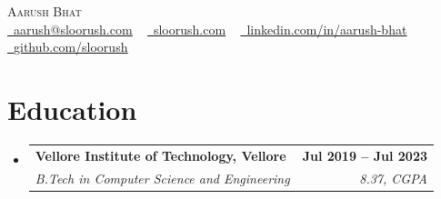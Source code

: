 \documentclass[a4paper,11pt]{article}
\makeatletter
\newcommand{\resumeSubheading}[4]{
  \vspace{-2pt}\item
    \begin{tabular*}{1.0\textwidth}[t]{l@{\extracolsep{\fill}}r}
      \textbf{#1} & \textbf{\small #2} \\
      \textit{\small#3} & \textit{\small #4} \\
    \end{tabular*}\vspace{-7pt}
}
\newcommand{\resumeSubHeadingListStart}{\begin{itemize}[leftmargin=0.0in, label={}]}
\newcommand{\resumeSubHeadingListEnd}{\end{itemize}}
\makeatother
\begin{document}

\begin{center}
    {\Huge \scshape Aarush Bhat} \\ \vspace{8pt}
    \small 
    \href{mailto:aarush@sloorush.com}{\raisebox{-0.2\height}\faEnvelope\  \underline{aarush@sloorush.com}} ~ 
    \href{https://sloorush.com}{\raisebox{-0.2\height}\faLink\   \underline{sloorush.com}} ~
    \href{https://linkedin.com/in/aarush-bhat/}{\raisebox{-0.2\height}\faLinkedin\ \underline{linkedin.com/in/aarush-bhat}}  ~
    \href{https://github.com/sloorush}{\raisebox{-0.2\height}\faGithub\ \underline{github.com/sloorush}}
    \vspace{-8pt}
\end{center}


\section{Education}
  \resumeSubHeadingListStart
    \resumeSubheading
      {Vellore Institute of Technology, Vellore}{Jul 2019 -- Jul 2023}
      {B.Tech in Computer Science and Engineering}{8.37, CGPA}
  \resumeSubHeadingListEnd
  
\end{document}
